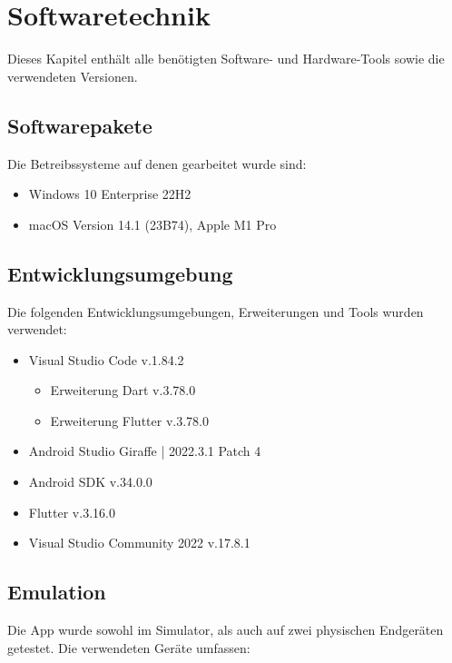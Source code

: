 
\chapter{Softwaretechnik}

Dieses Kapitel enthält alle benötigten Software- und Hardware-Tools sowie die verwendeten Versionen.

\section{Softwarepakete}

Die Betreibssysteme auf denen gearbeitet wurde sind:

\begin{itemize}
  \item Windows 10 Enterprise 22H2
  \item macOS Version 14.1 (23B74), Apple M1 Pro
\end{itemize}

\section{Entwicklungsumgebung}

Die folgenden Entwicklungsumgebungen, Erweiterungen und Tools wurden verwendet:

\begin{itemize}
  \item Visual Studio Code v.1.84.2
  \begin{itemize}
    \item Erweiterung Dart v.3.78.0
    \item Erweiterung Flutter v.3.78.0
  \end{itemize}
  \item Android Studio Giraffe | 2022.3.1 Patch 4
  \item Android SDK v.34.0.0
  \item Flutter v.3.16.0
  \item Visual Studio Community 2022 v.17.8.1
\end{itemize}


\section{Emulation}

Die App wurde sowohl im Simulator, als auch auf zwei physischen Endgeräten getestet.
Die verwendeten Geräte umfassen:

